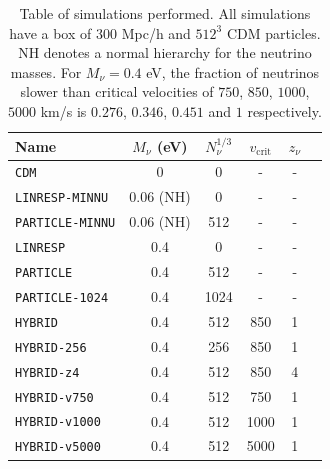 \documentclass[useAMS, usenatbib]{mnras}
\begin{document}
\begin{table}
\begin{center}
\begin{tabular}{|l|c|c|c|c|l|}
\hline
Name & $M_\nu$ (eV) &  $N_\nu^{1/3}$ & $v_\mathrm{crit}$ & $z_\nu$ \\
\hline
\texttt{CDM}    &       0             &             0         & - & -    \\
\texttt{LINRESP-MINNU}    &     0.06 (NH)      & 0         & - &  -  \\
\texttt{PARTICLE-MINNU}    &     0.06 (NH)      & 512      & - &  -  \\
\texttt{LINRESP}   &     0.4            & 0         & - &   - \\
\texttt{PARTICLE}    &     0.4             &   512       & - &   - \\
\texttt{PARTICLE-1024}    &     0.4             &    1024 & - & -    \\
\texttt{HYBRID}    &     0.4             &    512      & 850 & 1\\
\texttt{HYBRID-256}    &     0.4             &    256       & 850 &1 \\
\texttt{HYBRID-z4}    &     0.4             &    512       & 850 & 4  \\
\texttt{HYBRID-v750}  &     0.4             &    512       & 750 & 1\\
\texttt{HYBRID-v1000}   &     0.4             &    512       & 1000 & 1\\
\texttt{HYBRID-v5000}   &     0.4             &   512       & 5000 & 1 \\
\hline
\end{tabular}
\end{center}
\caption{Table of simulations performed. All simulations have a box of $300$ Mpc/h
and $512^3$ CDM particles. NH denotes a normal hierarchy for the neutrino masses.
For $M_\nu = 0.4$ eV, the fraction of neutrinos slower than critical velocities of $750$, $850$, $1000$, $5000$ km/s is $0.276$, $0.346$, $0.451$ and $1$ respectively.}
\label{tab:simulations}
\end{table}



%
\end{document}
